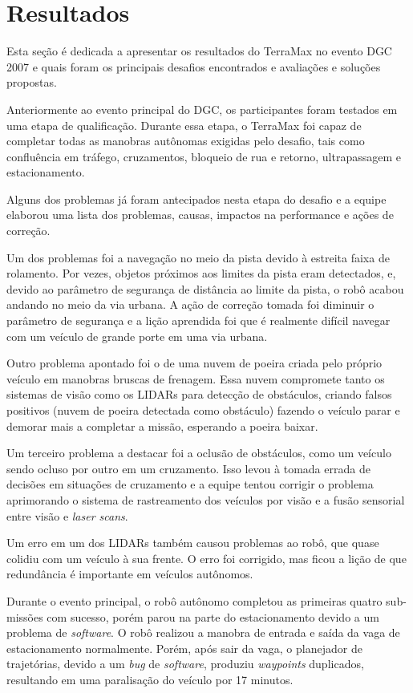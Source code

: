 \section{Resultados}

Esta seção é dedicada a apresentar os resultados do TerraMax no evento DGC 2007 e quais foram os principais desafios encontrados e avaliações e soluções propostas.

Anteriormente ao evento principal do DGC, os participantes foram testados em uma etapa de qualificação. Durante essa etapa, o TerraMax foi capaz de completar todas as manobras autônomas exigidas pelo desafio, tais como confluência em tráfego, cruzamentos, bloqueio de rua e retorno, ultrapassagem e estacionamento.

Alguns dos problemas já foram antecipados nesta etapa do desafio e a equipe elaborou uma lista dos problemas, causas, impactos na performance e ações de correção.

Um dos problemas foi a navegação no meio da pista devido à estreita faixa de rolamento. Por vezes, objetos próximos aos limites da pista eram detectados, e, devido ao parâmetro de segurança de distância ao limite da pista, o robô acabou andando no meio da via urbana. A ação de correção tomada foi diminuir o parâmetro de segurança e a lição aprendida foi que é realmente difícil navegar com um veículo de grande porte em uma via urbana.

Outro problema apontado foi o de uma nuvem de poeira criada pelo próprio veículo em manobras bruscas de frenagem. Essa nuvem compromete tanto os sistemas de visão como os LIDARs para detecção de obstáculos, criando falsos positivos (nuvem de poeira detectada como obstáculo) fazendo o veículo parar e demorar mais a completar a missão, esperando a poeira baixar.

Um terceiro problema a destacar foi a oclusão de obstáculos, como um veículo sendo ocluso por outro em um cruzamento. Isso levou à tomada errada de decisões em situações de cruzamento e a equipe tentou corrigir o problema aprimorando o sistema de rastreamento dos veículos por visão e a fusão sensorial entre visão e \emph{laser scans}.

Um erro em um dos LIDARs também causou problemas ao robô, que quase colidiu com um veículo à sua frente. O erro foi corrigido, mas ficou a lição de que redundância é importante em veículos autônomos.

Durante o evento principal, o robô autônomo completou as primeiras quatro sub-missões com sucesso, porém parou na parte do estacionamento devido a um problema de \emph{software}. O robô realizou a manobra de entrada e saída da vaga de estacionamento normalmente. Porém, após sair da vaga, o planejador de trajetórias, devido a um \emph{bug} de \emph{software}, produziu \emph{waypoints} duplicados, resultando em uma paralisação do veículo por 17 minutos.

